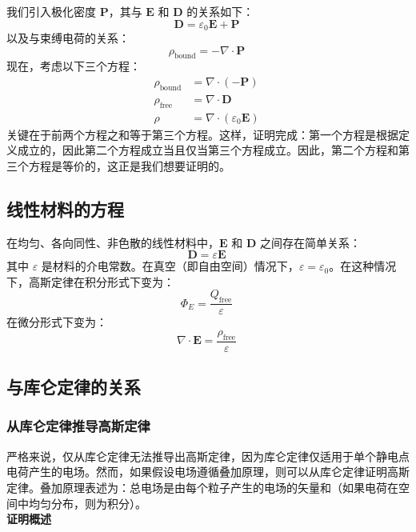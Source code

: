 我们引入极化密度 \( \mathbf{P} \)，其与 \( \mathbf{E} \) 和 \( \mathbf{D} \) 的关系如下：
\[
\mathbf{D} = \varepsilon_0 \mathbf{E} + \mathbf{P}~
\]
以及与束缚电荷的关系：
\[
\rho_{\mathrm{bound}} = -\nabla \cdot \mathbf{P}~
\]
现在，考虑以下三个方程：
\[
\begin{aligned}
\rho_{\mathrm{bound}} &= \nabla \cdot (-\mathbf{P}) \\
\rho_{\mathrm{free}} &= \nabla \cdot \mathbf{D} \\
\rho &= \nabla \cdot (\varepsilon_0 \mathbf{E})
\end{aligned}~
\]
关键在于前两个方程之和等于第三个方程。这样，证明完成：第一个方程是根据定义成立的，因此第二个方程成立当且仅当第三个方程成立。因此，第二个方程和第三个方程是等价的，这正是我们想要证明的。
\subsection{线性材料的方程}
在均匀、各向同性、非色散的线性材料中，\(\mathbf{E}\) 和 \(\mathbf{D}\) 之间存在简单关系：
\[
\mathbf{D} = \varepsilon \mathbf{E}~
\]
其中 \(\varepsilon\) 是材料的介电常数。在真空（即自由空间）情况下，\(\varepsilon = \varepsilon_0\)。在这种情况下，高斯定律在积分形式下变为：
\[
\Phi_{E} = \frac{Q_{\mathrm{free}}}{\varepsilon}~
\]
在微分形式下变为：
\[
\nabla \cdot \mathbf{E} = \frac{\rho_{\mathrm{free}}}{\varepsilon}~
\]
\subsection{与库仑定律的关系}
\subsubsection{从库仑定律推导高斯定律  }
严格来说，仅从库仑定律无法推导出高斯定律，因为库仑定律仅适用于单个静电点电荷产生的电场。然而，如果假设电场遵循叠加原理，则可以从库仑定律证明高斯定律。叠加原理表述为：总电场是由每个粒子产生的电场的矢量和（如果电荷在空间中均匀分布，则为积分）。\\
\textbf{证明概述}

